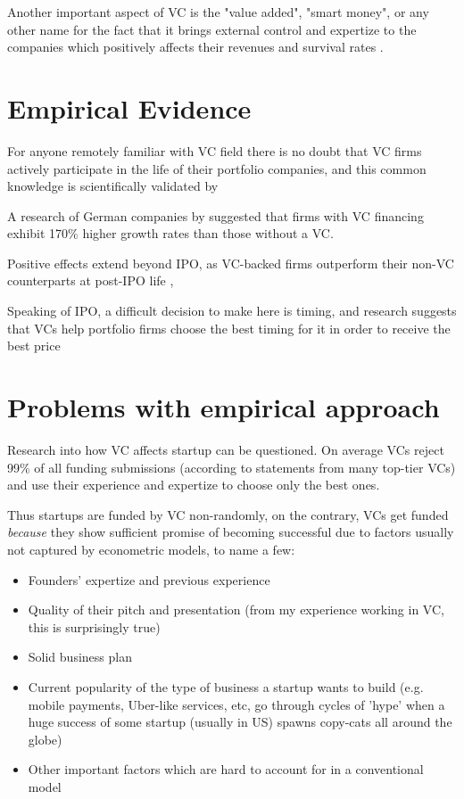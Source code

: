 Another important aspect of VC is the "value added", "smart money", or any other name for the fact that it brings external control and expertize to the companies  which positively affects their revenues and survival rates \parencite{vc_brander}.


\section{Empirical Evidence}
    For anyone remotely familiar with VC field there is no doubt that VC firms actively participate in the life of their portfolio companies, and this common knowledge is scientifically validated by \parencite{pommet}
    
    A research of German companies by \parencite{engel:2002} suggested that firms with VC financing exhibit 170\% higher growth rates than those without a VC.
    
    Positive effects extend beyond IPO, as VC-backed firms outperform their non-VC counterparts at post-IPO life \parencite{bagley}, \parencite{florin:2003}
    
    Speaking of IPO, a difficult decision to make here is timing, and research suggests that VCs help portfolio firms choose the best timing for it in order to receive the best price \parencite{hellmann:2000}
    


\section{Problems with empirical approach}
    
    Research into how VC affects startup can be questioned. On average VCs reject 99\% of all funding submissions (according to statements from many top-tier VCs) and use their experience and expertize to choose only the best ones.
    
    Thus startups are funded by VC non-randomly, on the contrary, VCs get funded \emph{because} they show sufficient promise of becoming successful due to factors usually not captured by econometric models, to name a few:
    
    \begin{itemize}
        \item Founders' expertize and previous experience
        \item Quality of their pitch and presentation (from my experience working in VC, this is surprisingly true)
        \item Solid business plan
        \item Current popularity of the type of business a startup wants to build (e.g. mobile payments, Uber-like services, etc, go through cycles of 'hype' when a huge success of some startup (usually in US) spawns copy-cats all around the globe)
        \item Other important factors which are hard to account for in a conventional model
    \end{itemize}
    
